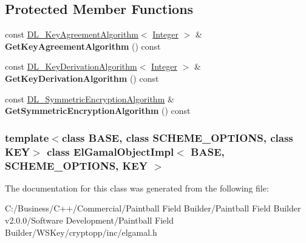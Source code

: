 \subsection*{Protected Member Functions}
\begin{DoxyCompactItemize}
\item 
\hypertarget{class_el_gamal_object_impl_a5a995dd0d1eb231599d66736308718b0}{
const \hyperlink{class_d_l___key_agreement_algorithm}{DL\_\-KeyAgreementAlgorithm}$<$ \hyperlink{class_integer}{Integer} $>$ \& {\bfseries GetKeyAgreementAlgorithm} () const }
\label{class_el_gamal_object_impl_a5a995dd0d1eb231599d66736308718b0}

\item 
\hypertarget{class_el_gamal_object_impl_ac5c3cc4e22d2b52585700ac4df1086c4}{
const \hyperlink{class_d_l___key_derivation_algorithm}{DL\_\-KeyDerivationAlgorithm}$<$ \hyperlink{class_integer}{Integer} $>$ \& {\bfseries GetKeyDerivationAlgorithm} () const }
\label{class_el_gamal_object_impl_ac5c3cc4e22d2b52585700ac4df1086c4}

\item 
\hypertarget{class_el_gamal_object_impl_a84c2429968e74060383233fd494f1356}{
const \hyperlink{class_d_l___symmetric_encryption_algorithm}{DL\_\-SymmetricEncryptionAlgorithm} \& {\bfseries GetSymmetricEncryptionAlgorithm} () const }
\label{class_el_gamal_object_impl_a84c2429968e74060383233fd494f1356}

\end{DoxyCompactItemize}
\subsubsection*{template$<$class BASE, class SCHEME\_\-OPTIONS, class KEY$>$ class ElGamalObjectImpl$<$ BASE, SCHEME\_\-OPTIONS, KEY $>$}



The documentation for this class was generated from the following file:\begin{DoxyCompactItemize}
\item 
C:/Business/C++/Commercial/Paintball Field Builder/Paintball Field Builder v2.0.0/Software Development/Paintball Field Builder/WSKey/cryptopp/inc/elgamal.h\end{DoxyCompactItemize}
